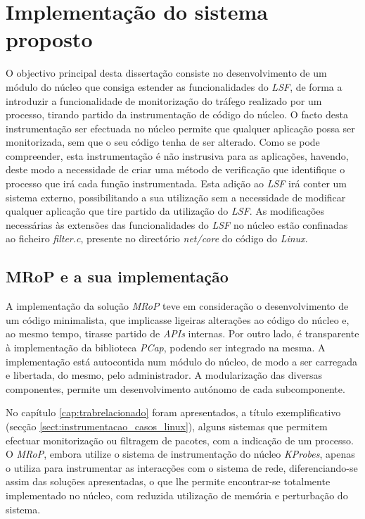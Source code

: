 \chapter{Implementação do sistema proposto}
\label{cap:Implementacao}




O objectivo principal desta dissertação consiste no desenvolvimento de um módulo do núcleo que consiga estender as funcionalidades do \textit{LSF}, de forma a introduzir a funcionalidade de monitorização do tráfego realizado por um processo, tirando partido da instrumentação de código do núcleo.
O facto desta instrumentação ser efectuada no núcleo permite que qualquer aplicação possa ser monitorizada, sem que o seu código tenha de ser alterado.
Como se pode compreender, esta instrumentação é não instrusiva para as aplicações, havendo, deste modo a necessidade de criar uma método de verificação que identifique o processo que irá cada função instrumentada.
Esta adição ao \textit{LSF} irá conter um sistema externo, possibilitando a sua utilização sem a necessidade de modificar qualquer aplicação que tire partido da utilização do \textit{LSF}.
As modificações necessárias às extensões das funcionalidades do \textit{LSF} no núcleo estão confinadas ao ficheiro \textit{filter.c}, presente no directório \textit{net/core} do código do \textit{Linux}.

\section{MRoP e a sua implementação}
\label{sec:mrop_implementation}

A implementação da solução \textit{MRoP} teve em consideração o desenvolvimento de um código minimalista, que implicasse ligeiras alterações ao código do núcleo e, ao mesmo tempo, tirasse partido de \textit{APIs} internas.
Por outro lado, é transparente à implementação da biblioteca \textit{PCap}, podendo ser integrado na mesma.
A implementação está autocontida num módulo do núcleo, de modo a ser carregada e libertada, do mesmo, pelo administrador.
A modularização das diversas componentes, permite um desenvolvimento autónomo de cada subcomponente.

No capítulo \ref{cap:trabrelacionado} foram apresentados, a título exemplificativo (secção \ref{sect:instrumentacao_casos_linux}), alguns sistemas que permitem efectuar monitorização ou filtragem de pacotes, com a indicação de um processo.
O \textit{MRoP}, embora utilize o sistema de instrumentação do núcleo \textit{KProbes}, apenas o utiliza para instrumentar as interacções com o sistema de rede, diferenciando-se assim das soluções apresentadas, o que lhe permite encontrar-se totalmente implementado no núcleo, com reduzida utilização de memória e perturbação do sistema.

